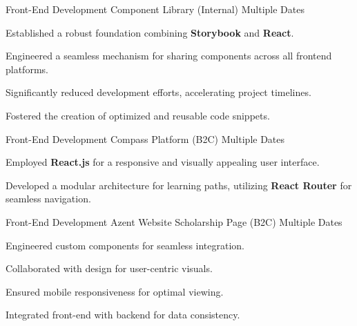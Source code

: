 



\begin{cventries}



\cventry
  {Front-End Development} %
  {Component Library (Internal)} %
  {Multiple Dates} %
  {} %
  {
    \begin{cvitems} %
      \item {Established a robust foundation combining \textbf{Storybook} and \textbf{React}.}
      \item {Engineered a seamless mechanism for sharing components across all frontend platforms.}
      \item {Significantly reduced development efforts, accelerating project timelines.}
      \item {Fostered the creation of optimized and reusable code snippets.}
    \end{cvitems}
}

\cventry
  {Front-End Development} %
  {Compass Platform (B2C)} %
  {Multiple Dates} %
  {} %
  {
    \begin{cvitems} %
      \item {Employed \textbf{React.js} for a responsive and visually appealing user interface.}
      \item {Developed a modular architecture for learning paths, utilizing \textbf{React Router} for seamless navigation.}
    \end{cvitems}
}

\cventry
  {Front-End Development} %
  {Azent Website Scholarship Page (B2C)} %
  {Multiple Dates} %
  {} %
  {
    \begin{cvitems} %
      \item {Engineered custom components for seamless integration.}
      \item {Collaborated with design for user-centric visuals.}
      \item {Ensured mobile responsiveness for optimal viewing.}
      \item {Integrated front-end with backend for data consistency.}
    \end{cvitems}
}


\end{cventries}
